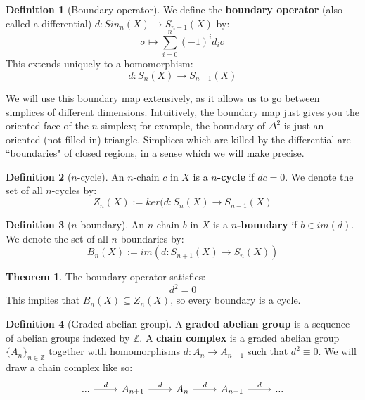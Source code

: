 \documentclass[11pt, oneside]{amsart}   	%
\theoremstyle{definition}
\newtheorem{definition}{Definition}[section]
\newtheorem{theorem}{Theorem}[section]
\begin{document}
\begin{definition}[Boundary operator]
	We define the \textbf{boundary operator} (also called a differential) $d : Sin_n(X)\rightarrow 
	S_{n - 1}(X)$ by:
	\begin{equation}
		\sigma\mapsto\sum_{i = 0}^n (-1)^i d_i\sigma
	\end{equation}
	This extends uniquely to a homomorphism:
	\begin{equation}
		d : S_n(X)\rightarrow S_{n - 1}(X)
	\end{equation}
\end{definition}

We will use this boundary map extensively, as it allows us to go between simplices of different dimensions. 
Intuitively, the boundary map just gives you the oriented face of the $n$-simplex; for example, the 
boundary of $\Delta^2$ is just an oriented (not filled in) triangle. Simplices which are killed by the 
differential are ``boundaries" of closed regions, in a sense which we will make precise.

\begin{definition}[$n$-cycle]
	An $n$-chain $c$ in $X$ is a \textbf{$n$-cycle} if $dc = 0$. We denote the set of all $n$-cycles by:
	\begin{equation}
		Z_n(X) := ker(d : S_n(X)\rightarrow S_{n - 1}(X)
	\end{equation}
\end{definition}

\begin{definition}[$n$-boundary]
	An $n$-chain $b$ in $X$ is a \textbf{$n$-boundary} if $b\in im(d)$. We denote the set of all 
	$n$-boundaries by:
	\begin{equation}
		B_n(X) := im(d : S_{n + 1}(X)\rightarrow S_n(X))
	\end{equation}
\end{definition}

\begin{theorem}
	The boundary operator satisfies:
	\begin{equation}
		d^2 = 0
	\end{equation}
	This implies that $B_n(X)\subseteq Z_n(X)$, so every boundary is a cycle. 
\end{theorem}

\begin{definition}[Graded abelian group]
	A \textbf{graded abelian group} is a sequence of abelian groups indexed by $\mathbb Z$. A 
	\textbf{chain complex} is a graded abelian group $\{A_n\}_{n\in\mathbb Z}$ together with 
	homomorphisms $d : A_n\rightarrow A_{n - 1}$ such that $d^2\equiv 0$. We will draw a chain 
	complex like so:
	\begin{equation}\begin{tikzcd}
			...\arrow[r, "d"] & A_{n + 1}\arrow[r, "d"] & A_n\arrow[r, "d"] & A_{n - 1}\arrow[r, "d"] & ...
	\end{tikzcd}\end{equation}
\end{definition}
\end{document}
